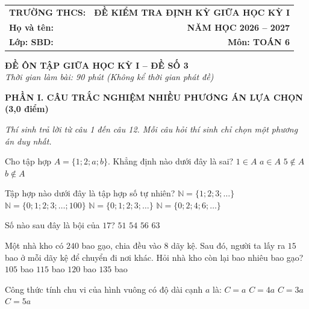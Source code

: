 \documentclass[12pt,a4paper]{article}
\begin{document}
\noindent
\begin{tabularx}{\linewidth}{X r}
\textbf{TRƯỜNG THCS: \dotfill} & \textbf{ĐỀ KIỂM TRA ĐỊNH KỲ GIỮA HỌC KỲ I} \\
\textbf{Họ và tên: \dotfill} & \textbf{NĂM HỌC 2026 -- 2027} \\
\textbf{Lớp: \dotfill \quad SBD: \dotfill} & \textbf{Môn: TOÁN 6} \\
\hline
\end{tabularx}
\vspace{2mm}

\begin{center}
  \textbf{\large ĐỀ ÔN TẬP GIỮA HỌC KỲ I -- ĐỀ SỐ 3}\\
  \textit{Thời gian làm bài: 90 phút (Không kể thời gian phát đề)}
\end{center}
\vspace{1mm}

\noindent\textbf{\large PHẦN I. CÂU TRẮC NGHIỆM NHIỀU PHƯƠNG ÁN LỰA CHỌN (3,0 điểm)}

\textit{Thí sinh trả lời từ câu 1 đến câu 12. Mỗi câu hỏi thí sinh chỉ chọn một phương án duy nhất.}

\vspace{1mm}
\begin{ex}
Cho tập hợp $A = \{1; 2; a; b\}$. Khẳng định nào dưới đây là sai?
\choice
{$1 \in A$}
{$a \in A$}
{$5 \notin A$}
{\True $b \notin A$}
\end{ex}

\begin{ex}
Tập hợp nào dưới đây là tập hợp số tự nhiên?
\choice
{$\mathbb{N} = \{1; 2; 3; \dots\}$}
{$\mathbb{N} = \{0; 1; 2; 3; \dots; 100\}$}
{\True $\mathbb{N} = \{0; 1; 2; 3; \dots\}$}
{$\mathbb{N} = \{0; 2; 4; 6; \dots\}$}
\end{ex}

\begin{ex}
Số nào sau đây là bội của $17$?
\choice
{\True $51$}
{$54$}
{$56$}
{$63$}
\end{ex}

\begin{ex}
Một nhà kho có $240$ bao gạo, chia đều vào $8$ dãy kệ. Sau đó, người ta lấy ra $15$ bao ở mỗi dãy kệ để chuyển đi nơi khác. Hỏi nhà kho còn lại bao nhiêu bao gạo?
\choice
{$105$ bao}
{$115$ bao}
{\True $120$ bao}
{$135$ bao}
\end{ex}

\begin{ex}
Công thức tính chu vi của hình vuông có độ dài cạnh $a$ là:
\choice
{$C = a$}
{\True $C = 4a$}
{$C = 3a$}
{$C = 5a$}
\end{ex}
\end{document}
